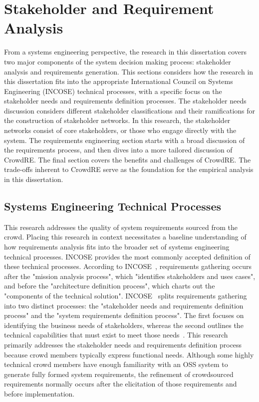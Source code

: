 \section{Stakeholder and Requirement Analysis}

From a systems engineering perspective, the research in this dissertation covers two major components of the system decision making process: stakeholder analysis and requirements generation. This sections considers how the research in this dissertation fits into the appropriate International Council on Systems Engineering (INCOSE) technical processes, with a specific focus on the stakeholder needs and requirements definition processes. The stakeholder needs discussion considers different stakeholder classifications and their ramifications for the construction of stakeholder networks. In this research, the stakeholder networks consist of core stakeholders, or those who engage directly with the system. The requirements engineering section starts with a broad discussion of the requirements process, and then dives into a more tailored discussion of CrowdRE. The final section covers the benefits and challenges of CrowdRE. The trade-offs inherent to CrowdRE serve as the foundation for the empirical analysis in this dissertation.

\subsection{Systems Engineering Technical Processes}

This research addresses the quality of system requirements sourced from the crowd. Placing this research in context necessitates a baseline understanding of how requirements analysis fits into the broader set of systems engineering technical processes. INCOSE provides the most commonly accepted definition of these technical processes. According to INCOSE~\cite{incose}, requirements gathering occurs after the "mission analysis process", which "identifies stakeholders and uses cases", and before the "architecture definition process", which charts out the "components of the technical solution". INCOSE~\cite{incose} splits requirements gathering into two distinct processes: the "stakeholder needs and requirements definition process" and the "system requirements definition process". The first focuses on identifying the business needs of stakeholders, whereas the second outlines the technical capabilities that must exist to meet those needs~\cite{incose}. This research primarily addresses the stakeholder needs and requirements definition process because crowd members typically express functional needs. Although some highly technical crowd members have enough familiarity with an OSS system to generate fully formed system requirements, the refinement of crowdsourced requirements normally occurs after the elicitation of those requirements and before implementation.

